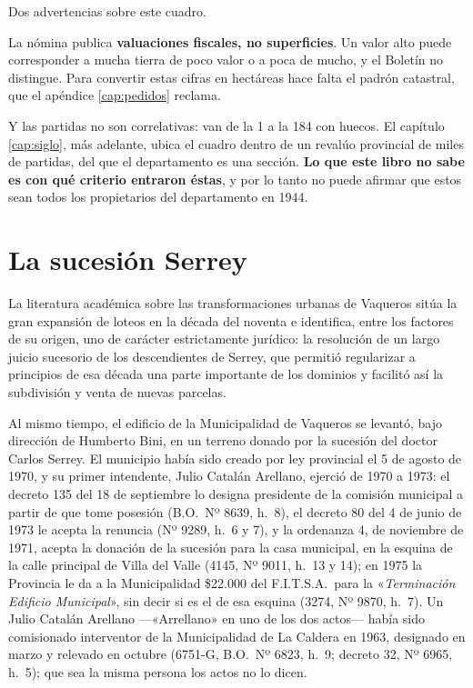 \begin{cautela}
Dos advertencias sobre este cuadro.

La nómina publica \textbf{valuaciones fiscales, no superficies}. Un valor alto puede
corresponder a mucha tierra de poco valor o a poca de mucho, y el Boletín no distingue. Para
convertir estas cifras en hectáreas hace falta el padrón catastral, que el apéndice \ref{cap:pedidos} reclama.

Y las partidas no son correlativas: van de la 1 a la 184 con huecos. El capítulo \ref{cap:siglo}, más
adelante, ubica el cuadro dentro de un revalúo provincial de miles de partidas, del que el
departamento es una sección. \textbf{Lo que este libro no sabe es con qué criterio entraron éstas}, y por lo tanto no puede
afirmar que estos sean todos los propietarios del departamento en 1944.
\end{cautela}

\section{La sucesión Serrey}

La literatura académica sobre las transformaciones urbanas de Vaqueros sitúa la gran
expansión de loteos en la década del noventa e identifica, entre los factores de su origen,
uno de carácter estrictamente jurídico: la resolución de un largo juicio sucesorio de los
descendientes de Serrey, que permitió regularizar a principios de esa década una parte
importante de los dominios y facilitó así la subdivisión y venta de nuevas parcelas.

Al mismo tiempo, el edificio de la Municipalidad de Vaqueros se levantó, bajo dirección de
Humberto Bini, en un terreno donado por la sucesión del doctor Carlos Serrey. El municipio
había sido creado por ley provincial el 5 de agosto de 1970, y su primer intendente, Julio
Catalán Arellano, ejerció de 1970 a 1973: el decreto 135 del 18 de septiembre lo designa presidente de la comisión municipal a partir de que tome posesión (B.O.\ Nº 8639, h.\ 8), el decreto 80 del 4 de junio de 1973 le acepta la renuncia (Nº 9289, h.\ 6 y 7), y la ordenanza 4, de noviembre de 1971, acepta la donación de la sucesión para la casa municipal, en la esquina de la calle principal de Villa del Valle (4145, Nº 9011, h.\ 13 y 14); en 1975 la Provincia le da a la Municipalidad \$22.000 del F.I.T.S.A.\ para la «\textit{Terminación Edificio Municipal}», sin decir si es el de esa esquina (3274, Nº 9870, h.\ 7). Un Julio Catalán Arellano ---«Arrellano» en uno de los dos actos--- había sido comisionado interventor de la Municipalidad de La Caldera en 1963, designado en marzo y relevado en octubre (6751-G, B.O.\ Nº 6823, h.\ 9; decreto 32, Nº 6965, h.\ 5); que sea la misma persona los actos no lo dicen.

